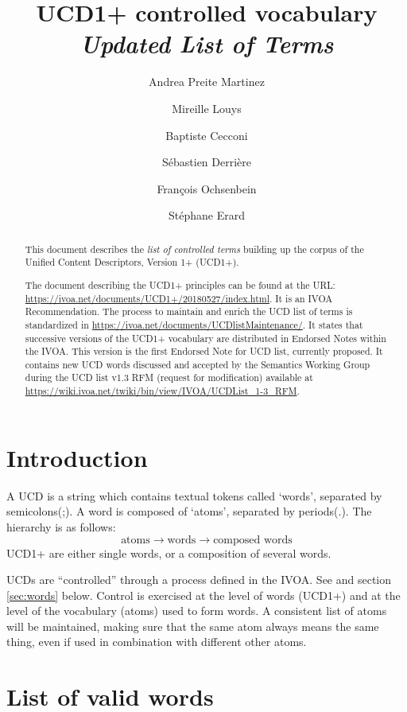 \documentclass[11pt,a4paper]{ivoa}
\title{UCD1+ controlled vocabulary\\ \emph{Updated List of Terms}}
\author{Andrea Preite Martinez}
\author{Mireille Louys}
\author{Baptiste Cecconi}
\author{S\'ebastien Derri\`ere}
\author{Fran\c cois Ochsenbein}
\author{St\'ephane Erard}
\begin{document}
\begin{abstract}
This document describes the \emph{list of controlled terms}  building up the corpus of the Unified Content Descriptors, Version 1+ (UCD1+). 

The document describing the UCD1+ principles can be found at the URL: \url{https://ivoa.net/documents/UCD1+/20180527/index.html}. 
It is an IVOA Recommendation. 
The process to maintain and enrich the UCD list of terms is standardized in  \url{https://ivoa.net/documents/UCDlistMaintenance/}.
It states that successive versions of the UCD1+ vocabulary are distributed in Endorsed Notes within the IVOA.
This version is the first Endorsed Note for UCD list, currently proposed. 
It contains new UCD words discussed and accepted by the Semantics Working Group during the UCD list v1.3 RFM (request for modification) available at \url{https://wiki.ivoa.net/twiki/bin/view/IVOA/UCDList_1-3_RFM}.

\end{abstract} 

\section{Introduction}

A UCD is a string which contains textual tokens called `words', separated by semicolons(;). A word is composed of 
`atoms', separated by periods(.). The hierarchy is as follows: 
$$
\textrm{atoms} \rightarrow \textrm{words} \rightarrow \textrm{composed words}
$$
UCD1+ are either single words, or a composition of several words.

UCDs are ``controlled'' through a process defined in the IVOA. See \citet{2005ivoa.spec.0819D} and section \ref{sec:words} below. 
Control is exercised at the level of words (UCD1+) and at the level of the vocabulary (atoms) used to form words. A 
consistent list of atoms will be maintained, making sure that the same atom always means the same thing, even if used 
in combination with different other atoms. 


\section{List of valid words}
\label{sec:list}
\end{document}
